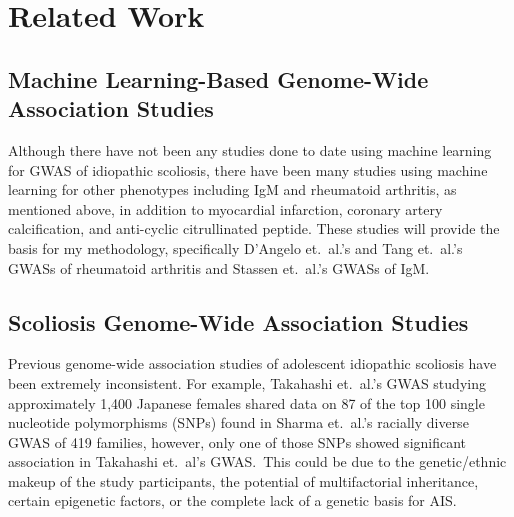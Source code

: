 \documentclass[12pt]{report}
\begin{document}
\section{Related Work}
\subsection{Machine Learning-Based Genome-Wide Association Studies}
Although there have not been any studies done to date using machine learning for
GWAS of idiopathic scoliosis, there have been many studies using machine learning
for other phenotypes including IgM and rheumatoid arthritis, as mentioned above,
in addition to myocardial infarction, coronary artery calcification, and anti-cyclic
citrullinated peptide\cite{Szymczak2016}. These studies will provide the basis
for my methodology, specifically D’Angelo et.\ al.’s\cite{DAngelo2009} and Tang
et.\ al.’s\cite{Tang2009} GWASs of rheumatoid arthritis and Stassen et.\ al.’s
GWASs of IgM.

\subsection{Scoliosis Genome-Wide Association Studies}
Previous genome-wide association studies of adolescent idiopathic scoliosis 
have been extremely inconsistent. For example, Takahashi et.\ al.'s\cite{Takahashi2011} 
GWAS studying approximately 1,400 Japanese females shared data on 87 of the top 
100 single nucleotide polymorphisms (SNPs) found in Sharma et.\ al.'s\cite{Sharma2011} 
racially diverse GWAS of 419 families, however, only one of those SNPs showed significant
association in Takahashi et.\ al's GWAS.\ This could be due to the genetic/ethnic 
makeup of the study participants, the potential of multifactorial inheritance, 
certain epigenetic factors, or the complete lack of a genetic basis for AIS. 
\end{document}
